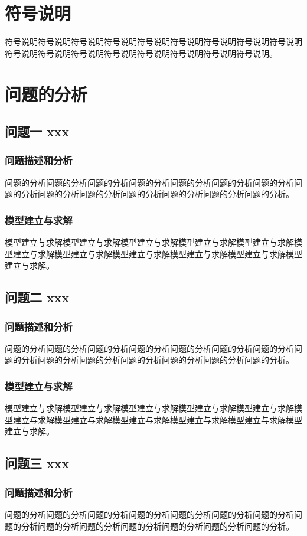 \documentclass[bwprint]{gmcmthesis}
\numberwithin{figure}{section}
\begin{document}
\section{符号说明}
符号说明符号说明符号说明符号说明符号说明符号说明符号说明符号说明符号说明符号说明符号说明符号说明符号说明符号说明符号说明符号说明符号说明。
\section{问题的分析}
\subsection{问题一 xxx}
\subsubsection{问题描述和分析}
问题的分析问题的分析问题的分析问题的分析问题的分析问题的分析问题的分析问题的分析问题的分析问题的分析问题的分析问题的分析问题的分析问题的分析。
\subsubsection{模型建立与求解}
模型建立与求解模型建立与求解模型建立与求解模型建立与求解模型建立与求解模型建立与求解模型建立与求解模型建立与求解模型建立与求解模型建立与求解模型建立与求解。


\subsection{问题二 xxx}
\subsubsection{问题描述和分析}
问题的分析问题的分析问题的分析问题的分析问题的分析问题的分析问题的分析问题的分析问题的分析问题的分析问题的分析问题的分析问题的分析问题的分析。
\subsubsection{模型建立与求解}
模型建立与求解模型建立与求解模型建立与求解模型建立与求解模型建立与求解模型建立与求解模型建立与求解模型建立与求解模型建立与求解模型建立与求解模型建立与求解。

\subsection{问题三 xxx}
\subsubsection{问题描述和分析}
问题的分析问题的分析问题的分析问题的分析问题的分析问题的分析问题的分析问题的分析问题的分析问题的分析问题的分析问题的分析问题的分析问题的分析。
\end{document}
